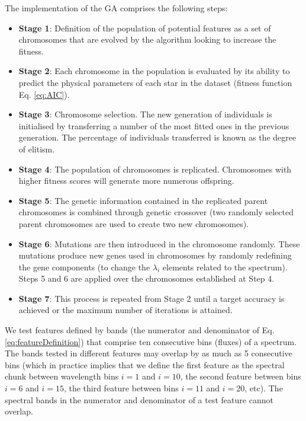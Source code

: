 The implementation of the GA comprises the following steps:

\begin{itemize}
\item \textbf{Stage 1}:{ Definition of the population of
potential features as a set of chromosomes
that are evolved by the algorithm looking to increase the fitness. }

\item \textbf{Stage 2}:{ Each chromosome in the population
is evaluated by its ability to predict the physical parameters of each
star in the dataset (fitness function Eq. \ref{eq:AIC}). }

\item \textbf{Stage 3}:{ Chromosome selection. The new
generation of individuals is initialised by transferring a number of
the most fitted ones in the previous generation. The percentage of
individuals transferred is known as the degree of elitism. }

\item \textbf{Stage 4}:{ The population of chromosomes is replicated. 
 Chromosomes with higher fitness scores will generate more numerous
 offspring.}

\item \textbf{Stage 5}:{ The genetic information contained in
the replicated parent chromosomes is combined through genetic
crossover (two randomly selected parent chromosomes are used to create
two new chromosomes).}

\item \textbf{Stage 6}:{ Mutations are then introduced in the
chromosome randomly. These mutations produce new genes used in
chromosomes by randomly redefining the gene components
(to change the $\lambda_i$ elements related to the spectrum).  
Steps 5 and 6 are applied over the chromosomes established at Step 4.}

\item \textbf{Stage 7}:{ This process is repeated from Stage 2 until 
a target accuracy is achieved or the maximum number of iterations is
attained.}

\end{itemize}

We test features defined by bands (the numerator and denominator of
Eq. \ref{eq:featureDefinition}) that comprise ten consecutive bins
(fluxes) of a spectrum. The bands tested in different features may
overlap by as much as 5 consecutive bins (which in practice implies
that we define the first feature as the spectral chunk between
wavelength bins $i=1$ and $i=10$, the second feature between bins
$i=6$ and $i=15$, the third feature between bins $i=11$ and $i=20$,
etc). The spectral bands in the numerator and denominator of a test
feature cannot overlap.

